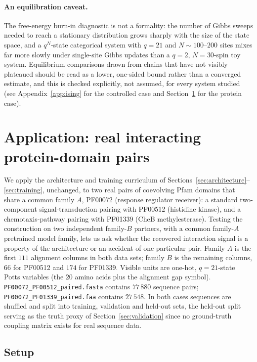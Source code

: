 \documentclass[11pt]{article}
\begin{document}
\paragraph{An equilibration caveat.} The free-energy burn-in diagnostic is
not a formality: the number of Gibbs sweeps needed to reach a stationary
distribution grows sharply with the size of the state space, and a
$q^{N}$-state categorical system with $q=21$ and $N\sim100$--$200$ sites
mixes far more slowly under single-site Gibbs updates than a $q=2$,
$N=30$-spin toy system. Equilibrium comparisons drawn from chains that
have not visibly plateaued should be read as a lower, one-sided bound
rather than a converged estimate, and this is checked explicitly, not
assumed, for every system studied (see Appendix~\ref{app:ising} for the
controlled case and Section~\ref{sec:protein} for the protein case).

\section{Application: real interacting protein-domain pairs}
\label{sec:protein}

We apply the architecture and training curriculum of
Sections~\ref{sec:architecture}--\ref{sec:training}, unchanged, to two
real pairs of coevolving Pfam domains that share a common family $A$,
PF00072 (response regulator receiver): a standard two-component
signal-transduction pairing with PF00512 (histidine kinase), and a
chemotaxis-pathway pairing with PF01339 (CheB methylesterase). Testing
the construction on two independent family-$B$ partners, with a common
family-$A$ pretrained model family, lets us ask whether the recovered
interaction signal is a property of the architecture or an accident of
one particular pair. Family $A$ is the first $111$ alignment columns in
both data sets; family $B$ is the remaining columns, $66$ for PF00512 and
$174$ for PF01339. Visible units are one-hot, $q=21$-state Potts
variables (the $20$ amino acids plus the alignment gap symbol).
\texttt{PF00072\_PF00512\_paired.fasta} contains $77\,880$ sequence pairs;
\texttt{PF00072\_PF01339\_paired.faa} contains $27\,548$. In both cases
sequences are shuffled and split into training, validation and held-out
sets, the held-out split serving as the truth proxy of
Section~\ref{sec:validation} since no ground-truth coupling matrix exists
for real sequence data.

\subsection{Setup}
\end{document}
